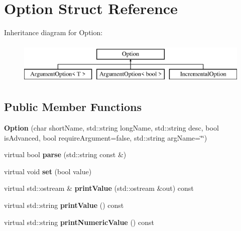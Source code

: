 \hypertarget{structOption}{}\section{Option Struct Reference}
\label{structOption}
Inheritance diagram for Option\+:\begin{figure}[H]
\begin{center}
\leavevmode
\includegraphics[height=2.000000cm]{structOption}
\end{center}
\end{figure}
\subsection*{Public Member Functions}
\begin{DoxyCompactItemize}
\item 
\mbox{\label{structOption_a7162b133f8c02e2ac33189af638f8d47}} 
{\bfseries Option} (char short\+Name, std\+::string long\+Name, std\+::string desc, bool is\+Advanced, bool require\+Argument=false, std\+::string arg\+Name=\char`\"{}\char`\"{})
\item 
\mbox{\label{structOption_af0e94bc1aa22192de80e95115de36dfc}} 
virtual bool {\bfseries parse} (std\+::string const \&)
\item 
\mbox{\label{structOption_a523a54cb288d1f09e612276cb90be891}} 
virtual void {\bfseries set} (bool value)
\item 
\mbox{\label{structOption_af6af2ba3a9559424ddf872177645f27b}} 
virtual std\+::ostream \& {\bfseries print\+Value} (std\+::ostream \&out) const
\item 
\mbox{\label{structOption_a399aba201b2fd43159053ec0a02d18aa}} 
virtual std\+::string {\bfseries print\+Value} () const
\item 
\mbox{\label{structOption_a7d86d853ec1ce2378bcb68773fdb4564}} 
virtual std\+::string {\bfseries print\+Numeric\+Value} () const
\end{DoxyCompactItemize}
